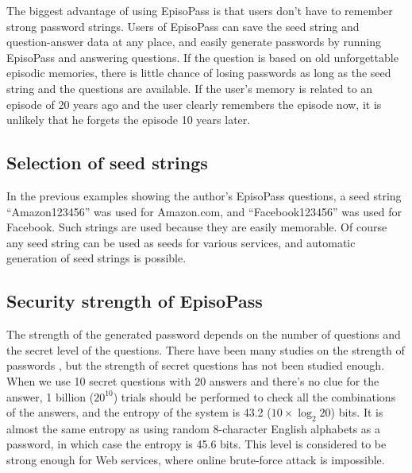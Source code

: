 \documentclass[runningheads,a4paper]{llncs}
\begin{document}
The biggest advantage of using EpisoPass is that
users don't have to remember strong password strings.
%
Users of EpisoPass can save the seed string and question-answer data
at any place, and easily generate passwords by running
EpisoPass and answering questions.
If the question is based on old unforgettable episodic memories,
there is little chance of losing passwords
as long as the seed string and the questions are available.
If the user's memory is related to an episode of 20 years ago and the user clearly
remembers the episode now, it is unlikely that he forgets the episode 10 years later.

\subsection{Selection of seed strings}

In the previous examples showing the author's EpisoPass questions,
a seed string ``\textsf{Amazon123456}'' was used for Amazon.com, and
``\textsf{Facebook123456}'' was used for Facebook.
Such strings are used because they are easily memorable.
Of course any seed string can be used as seeds for various services,
and automatic generation of seed strings is possible.


\subsection{Security strength of EpisoPass}

The strength of the generated password depends on the number of
questions and the secret level of the questions.
%
There have been many studies on the strength of passwords
\cite{Hayashi:2011:DSP:1978942.1979326}%
\cite{Komanduri:2011:PPM:1978942.1979321}, %
but the strength of secret questions has not been studied enough.
%
When we use 10 secret questions with 20 answers and
there's no clue for the answer,
1 billion ($20^{10}$) trials should be performed to check
all the combinations of the answers,
and the entropy of the system is 43.2 ($10 \times \log_2 20$) bits.  %
%
It is almost the same entropy as using random 8-character English alphabets
as a password, in which case the entropy is 45.6 bits.
This level is considered to be strong enough for Web services,
where online brute-force attack is impossible\cite{Florencio:2007:SWP:1361419.1361429}.
\end{document}

